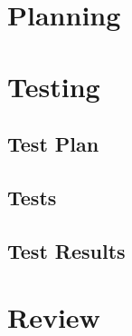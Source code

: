 \documentclass{article}
\begin{document}
\section{Planning}


\section{Testing}
\subsection{Test Plan}

\subsection{Tests}

\subsection{Test Results}

\section{Review}
\end{document}
